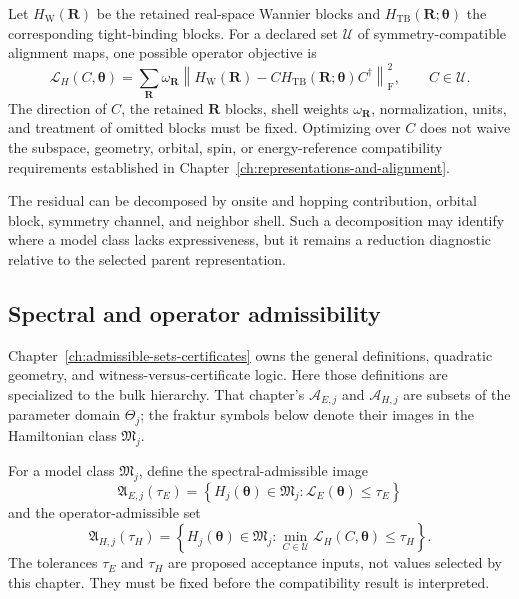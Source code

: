 Let $H_{\mathrm W}(\mathbf R)$ be the retained real-space Wannier blocks and
$H_{\mathrm{TB}}(\mathbf R;\boldsymbol\theta)$ the corresponding tight-binding
blocks. For a declared set $\mathcal U$ of symmetry-compatible alignment maps,
one possible operator objective is
\begin{equation}
  \mathcal L_H(C,\boldsymbol\theta)
  =
  \sum_{\mathbf R}\omega_{\mathbf R}
  \left\|
    H_{\mathrm W}(\mathbf R)
    -C H_{\mathrm{TB}}(\mathbf R;\boldsymbol\theta)C^{\dagger}
  \right\|_{\mathrm F}^{2},
  \qquad C\in\mathcal U.
\end{equation}
The direction of $C$, the retained $\mathbf R$ blocks, shell weights
$\omega_{\mathbf R}$, normalization, units, and treatment of omitted blocks
must be fixed. Optimizing over $C$ does not waive the subspace, geometry,
orbital, spin, or energy-reference compatibility requirements established in
Chapter~\ref{ch:representations-and-alignment}.

The residual can be decomposed by onsite and hopping contribution, orbital
block, symmetry channel, and neighbor shell. Such a decomposition may identify
where a model class lacks expressiveness, but it remains a reduction diagnostic
relative to the selected parent representation.

\subsection{Spectral and operator admissibility}


Chapter~\ref{ch:admissible-sets-certificates} owns the general definitions,
quadratic geometry, and witness-versus-certificate logic. Here those definitions
are specialized to the bulk hierarchy. That chapter's $\mathcal A_{E,j}$ and
$\mathcal A_{H,j}$ are subsets of the parameter domain $\Theta_j$; the
fraktur symbols below denote their images in the Hamiltonian class
$\mathfrak M_j$.

For a model class $\mathfrak M_j$, define the spectral-admissible image
\begin{equation}
  \mathfrak A_{E,j}(\tau_E)
  =
  \left\{
    H_j(\boldsymbol\theta)\in\mathfrak M_j:
    \mathcal L_E(\boldsymbol\theta)\leq\tau_E
  \right\}
\end{equation}
and the operator-admissible set
\begin{equation}
  \mathfrak A_{H,j}(\tau_H)
  =
  \left\{
    H_j(\boldsymbol\theta)\in\mathfrak M_j:
    \min_{C\in\mathcal U}\mathcal L_H(C,\boldsymbol\theta)
    \leq\tau_H
  \right\}.
\end{equation}
The tolerances $\tau_E$ and $\tau_H$ are proposed acceptance inputs, not values
selected by this chapter. They must be fixed before the compatibility result is
interpreted.

